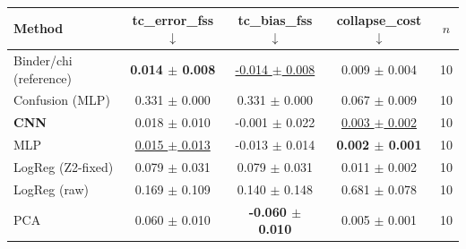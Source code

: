 \begin{tabular}{lcccc}
\toprule
Method & tc\_error\_fss $\downarrow$ & tc\_bias\_fss $\downarrow$ & collapse\_cost $\downarrow$ & $n$ \\
\midrule
Binder/chi (reference) & \textbf{0.014 $\pm$ 0.008} & \underline{-0.014 $\pm$ 0.008} & 0.009 $\pm$ 0.004 & 10 \\
Confusion (MLP) & 0.331 $\pm$ 0.000 & 0.331 $\pm$ 0.000 & 0.067 $\pm$ 0.009 & 10 \\
\textbf{CNN} & 0.018 $\pm$ 0.010 & -0.001 $\pm$ 0.022 & \underline{0.003 $\pm$ 0.002} & 10 \\
MLP & \underline{0.015 $\pm$ 0.013} & -0.013 $\pm$ 0.014 & \textbf{0.002 $\pm$ 0.001} & 10 \\
LogReg (Z2-fixed) & 0.079 $\pm$ 0.031 & 0.079 $\pm$ 0.031 & 0.011 $\pm$ 0.002 & 10 \\
LogReg (raw) & 0.169 $\pm$ 0.109 & 0.140 $\pm$ 0.148 & 0.681 $\pm$ 0.078 & 10 \\
PCA & 0.060 $\pm$ 0.010 & \textbf{-0.060 $\pm$ 0.010} & 0.005 $\pm$ 0.001 & 10 \\
\bottomrule
\end{tabular}

